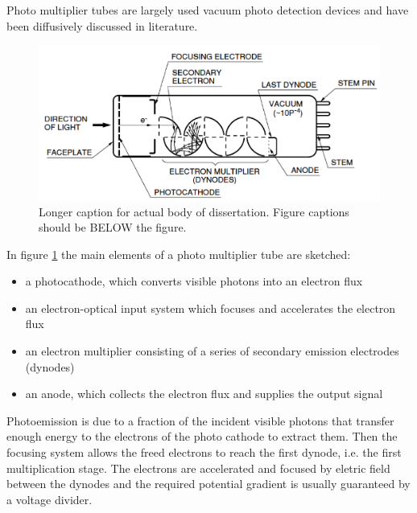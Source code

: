 Photo multiplier tubes are largely used vacuum photo detection devices and have been diffusively discussed in literature. 
\begin{figure}[htbp]
\begin{center}
\includegraphics[width=5in]{../Pictures/Chapter_3/PMT.png}
\end{center}
\caption[Short caption for table of figures.]{Longer caption for actual body
of dissertation.  Figure captions should be BELOW the figure.}
\label{fig:PMT_schematics}
\end{figure}
In figure \ref{fig:PMT_schematics} the main elements of a photo multiplier tube are sketched:
\begin{itemize}
\item a photocathode, which converts visible photons into an electron flux
\item an electron-optical input system which focuses and accelerates the electron flux
\item an electron multiplier consisting of a series of secondary emission electrodes (dynodes)
\item an anode, which collects the electron flux and supplies the output signal
\end{itemize}
Photoemission is due to a fraction of the incident visible photons that transfer enough energy to the electrons of the photo cathode to extract them.
Then the focusing system allows the freed electrons to reach the first dynode, i.e. the first multiplication stage. The electrons are accelerated and focused by eletric field between the dynodes and the required potential gradient is usually guaranteed by a voltage divider.


